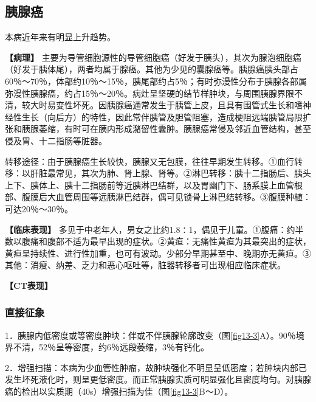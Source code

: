 \subsection{胰腺癌}

本病近年来有明显上升趋势。

\textbf{【病理】}
主要为导管细胞源性的导管细胞癌（好发于胰头），其次为腺泡细胞癌（好发于胰体尾），两者均属于腺癌。其他为少见的囊腺癌等。胰腺癌胰头部占60％～70％，体部约10％～15％，胰尾部约占5％；有时弥漫性分布于胰腺各部属弥漫性胰腺癌，约占15％～20％。病灶呈坚硬的结节样肿块，与周围胰腺界限不清，较大时易变性坏死。因胰腺癌通常发生于胰管上皮，且具有围管式生长和嗜神经性生长（向后方）的特性，因此常伴胰管及胆管阻塞，造成梗阻远端胰管局限扩张和胰腺萎缩，有时可在胰内形成潴留性囊肿。胰腺癌常侵及邻近血管结构，甚至侵及胃、十二指肠等脏器。

转移途径：由于胰腺癌生长较快，胰腺又无包膜，往往早期发生转移。①血行转移：以肝脏最常见，其次为肺、肾上腺、肾等。②淋巴转移：胰十二指肠后、胰头上下、胰体上、胰十二指肠前等近胰淋巴结群，以及胃幽门下、肠系膜上血管根部、腹膜后大血管周围等远胰淋巴结群，偶可见锁骨上淋巴结转移。③腹膜种植：可达20％～30％。

\textbf{【临床表现】}
多见于中老年人，男女之比约1.8∶1，偶见于儿童。①腹痛：约半数以腹痛和腹部不适为最早出现的症状。②黄疸：无痛性黄疸为其最突出的症状，黄疸呈持续性、进行性加重，也可有波动。少部分早期甚至中、晚期亦无黄疸。③其他：消瘦、纳差、乏力和恶心呕吐等，脏器转移者可出现相应临床症状。

\textbf{【CT表现】}

\subsubsection{直接征象}

1．胰腺内低密度或等密度肿块：伴或不伴胰腺轮廓改变（图\ref{fig13-3}A）。90％境界不清，52％呈等密度，约6％远段萎缩，3％有钙化。

2．增强扫描：本病为少血管性肿瘤，故肿块强化不明显呈低密度；若肿块内部已发生坏死液化时，则呈更低密度。而正常胰腺实质可明显强化且密度均匀。对胰腺癌的检出以实质期（40s）增强扫描为佳（图\ref{fig13-3}B～D）。

